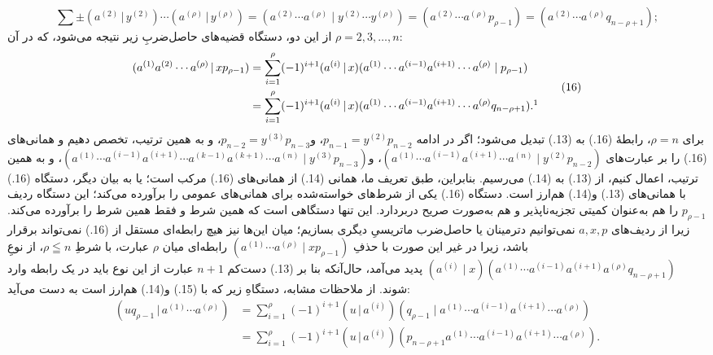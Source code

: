 \documentclass[11pt]{article}
\providecommand{\pair}[2]{(#1\,|\,#2)}
\begin{document}
\[
\sum\pm\pair{a^{(2)}}{y^{(2)}}\cdots\pair{a^{(\rho)}}{y^{(\rho)}}
=(a^{(2)}\cdots a^{(\rho)}\mid y^{(2)}\cdots y^{(\rho)})
=(a^{(2)}\cdots a^{(\rho)}p_{\rho-1})=(a^{(2)}\cdots a^{(\rho)}q_{n-\rho+1});
\]
از این دو، دستگاه قضیه‌های حاصل‌ضربِ زیر نتیجه می‌شود، که در آن $\rho=2,3,\ldots,n$:
\begin{equation}
\begin{aligned}
\pair{a^{(1)}a^{(2)}\cdots a^{(\rho)}}{xp_{\rho-1}}
 &=\sum_{i=1}^{\rho}(-1)^{i+1}\pair{a^{(i)}}{x}(a^{(1)}\cdots a^{(i-1)}a^{(i+1)}\cdots a^{(\rho)}\mid p_{\rho-1})\\
 &=\sum_{i=1}^{\rho}(-1)^{i+1}\pair{a^{(i)}}{x}(a^{(1)}\cdots a^{(i-1)}a^{(i+1)}\cdots a^{(\rho)}q_{n-\rho+1}).\footnotemark
\end{aligned}
\tag{16}
\end{equation}
برای $\rho=n$، رابطهٔ (16.) به (13.) تبدیل می‌شود؛ اگر در ادامه $p_{n-1}=y^{(2)}p_{n-2}$، و$p_{n-2}=y^{(3)}p_{n-3}$، و به همین ترتیب، تخصص دهیم و همانی‌های (16.) را بر عبارت‌های $(a^{(1)}\cdots a^{(i-1)}a^{(i+1)}\cdots a^{(n)}\mid y^{(2)}p_{n-2})$، و$(a^{(1)}\cdots a^{(i-1)}a^{(i+1)}\cdots a^{(k-1)}a^{(k+1)}\cdots a^{(n)}\mid y^{(3)}p_{n-3})$، و به همین ترتیب، اعمال کنیم، از (13.) به (14.) می‌رسیم. بنابراین، طبق تعریف ما، همانی (14.) از همانی‌های (16.) مرکب است؛ یا به بیان دیگر، دستگاه (16.) با همانی‌های (13.) و(14.) هم‌ارز است. دستگاه (16.) یکی از شرط‌های خواسته‌شده برای همانی‌های عمومی را برآورده می‌کند؛ این دستگاه ردیف $p_{\rho-1}$ را هم به‌عنوان کمیتی تجزیه‌ناپذیر و هم به‌صورت صریح دربردارد. این تنها دستگاهی است که همین شرط و فقط همین شرط را برآورده می‌کند. زیرا از ردیف‌های $a,x,p$ نمی‌توانیم دترمینان یا حاصل‌ضرب ماتریسیِ دیگری بسازیم؛ میان این‌ها نیز هیچ رابطه‌ای مستقل از (16.) نمی‌تواند برقرار باشد، زیرا در غیر این صورت با حذفِ $(a^{(1)}\cdots a^{(\rho)}\mid xp_{\rho-1})$ رابطه‌ای میان $\rho$ عبارت، با شرطِ $\rho\leqq n$، از نوعِ $(a^{(i)}\mid x)(a^{(1)}\cdots a^{(i-1)}a^{(i+1)}a^{(\rho)}q_{n-\rho+1})$ پدید می‌آمد، حال‌آنکه بنا بر (13.) دست‌کم $n+1$ عبارت از این نوع باید در یک رابطه وارد شوند. از ملاحظات مشابه، دستگاهِ زیر که با (15.) و(14.) هم‌ارز است به دست می‌آید:
\begin{equation}
\begin{aligned}
\pair{u q_{\rho-1}}{a^{(1)}\cdots a^{(\rho)}}
 &=\sum_{i=1}^{\rho}(-1)^{i+1}\pair{u}{a^{(i)}}(q_{\rho-1}\mid a^{(1)}\cdots a^{(i-1)}a^{(i+1)}\cdots a^{(\rho)})\\
 &=\sum_{i=1}^{\rho}(-1)^{i+1}\pair{u}{a^{(i)}}(p_{n-\rho+1}a^{(1)}\cdots a^{(i-1)}a^{(i+1)}\cdots a^{(\rho)}).
\end{aligned}
\tag{17}
\end{equation}
\end{document}

